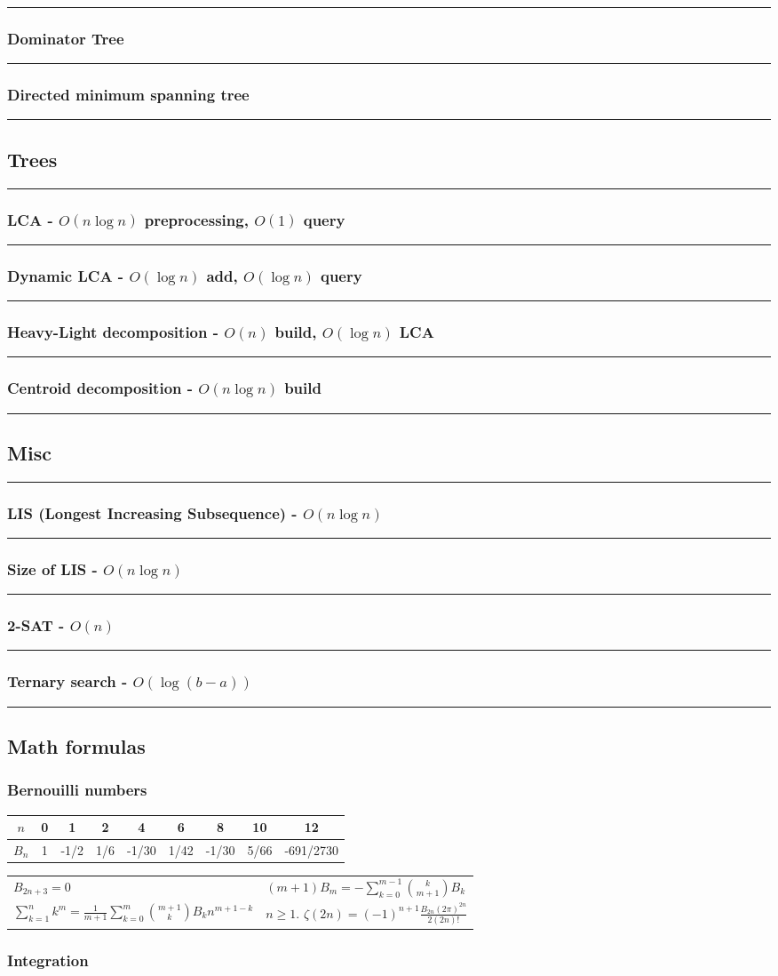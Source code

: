 \documentclass[landscape,a4paper,twocolumn,10pt]{report}
\renewcommand{\line}{\noindent\rule{\linewidth}{1pt}}
\newcommand{\algosection}[1]{\line \subsection*{#1}}
\newcommand{\algorithm}[1]{\line \subsubsection*{#1}}
\begin{document}
\algorithm{Dominator Tree}


\algorithm{Directed minimum spanning tree}


\algosection{Trees}
\label{trees}

\algorithm{LCA - $O(n \log n)$ preprocessing, $O(1)$ query}


\algorithm{Dynamic LCA - $O(\log n)$ add, $O(\log n)$ query}


\algorithm{Heavy-Light decomposition - $O(n)$ build, $O(\log n)$ LCA}


\algorithm{Centroid decomposition - $O(n \log n)$ build}



\algosection{Misc}
\label{misc}

\algorithm{LIS (Longest Increasing Subsequence) - $O(n \log n)$}


\algorithm{Size of LIS - $O(n \log n)$}


\algorithm{2-SAT - $O(n)$}


\algorithm{Ternary search - $O(\log(b-a))$}


\algosection{Math formulas}
\label{mathformulas}

\subsubsection*{Bernouilli numbers}

\begin{tabular}{|c|c|c|c|c|c|c|c|c|}
\hline
$n$ & 0 & 1 & 2 & 4 & 6 & 8 & 10 & 12\\
\hline
$B_n$ & 1 & -1/2 & 1/6 & -1/30 & 1/42 & -1/30 & 5/66 & -691/2730 \\
\hline
\end{tabular}

\begin{tabular}{@{}ll@{}}
$B_{2n+3} = 0$
&
$(m+1) B_m = - \sum_{k=0}^{m-1}\binom{k}{m+1}B_k$
\\
$\sum_{k=1}^nk^m=\frac{1}{m+1}\sum_{k=0}^m\binom{m+1}{k}B_kn^{m+1-k}$
&
$n\geq 1$. $\zeta(2n) = (-1)^{n+1} \frac{B_{2n} (2\pi)^{2n}}{2(2n)!}$
\end{tabular}
\medskip

\subsubsection*{Integration}
\end{document}
